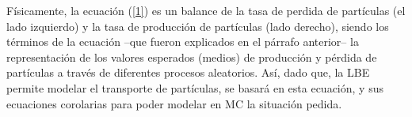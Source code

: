 Físicamente, la ecuación (\ref{1}) es un balance de la tasa de perdida de partículas (el lado izquierdo) y la tasa de producción de partículas (lado derecho), siendo los términos de la ecuación --que fueron explicados en el párrafo anterior-- la representación de los valores esperados (medios) de producción y pérdida de partículas a través de diferentes procesos aleatorios. Así, dado que, la LBE permite modelar el transporte de partículas, se basará en esta ecuación, y sus ecuaciones corolarias para poder modelar en MC la situación pedida. \\



